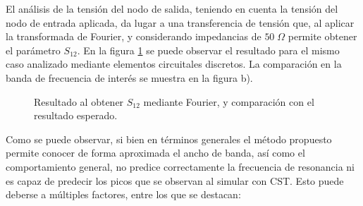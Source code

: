 El análisis de la tensión del nodo de salida, teniendo en cuenta la tensión del nodo de entrada aplicada, da lugar a una transferencia de tensión que, al aplicar la transformada de Fourier, y considerando impedancias de $50 \; \Omega$ permite obtener el parámetro $S_{12}$. En la figura \ref{fig:resultado_s12_tlm} se puede observar el resultado para el mismo caso analizado mediante elementos circuitales discretos. La comparación en la banda de frecuencia de interés se muestra en la figura b).

\begin{figure}[htp]
	\centering 
	\hspace{0pt}
	\caption{Resultado al obtener $S_{12}$ mediante Fourier, y comparación con el resultado esperado.}
	\label{fig:resultado_s12_tlm}
\end{figure}

Como se puede observar, si bien en términos generales el método propuesto permite conocer de forma aproximada el ancho de banda, así como el comportamiento general, no predice correctamente la frecuencia de resonancia ni es capaz de predecir los picos que se observan al simular con CST. Esto puede deberse a múltiples factores, entre los que se destacan:

